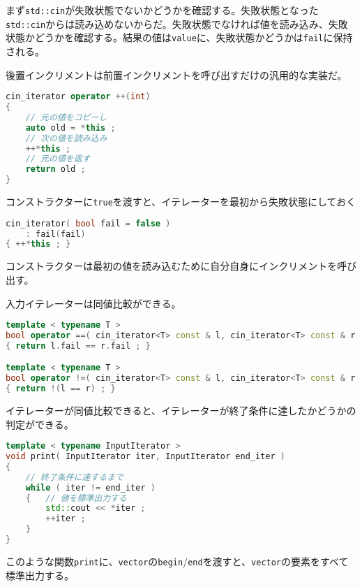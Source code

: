 まず\texttt{std::cin}が失敗状態でないかどうかを確認する。失敗状態となった\texttt{std::cin}からは読み込めないからだ。失敗状態でなければ値を読み込み、失敗状態かどうかを確認する。結果の値は\texttt{value}に、失敗状態かどうかは\texttt{fail}に保持される。

後置インクリメントは前置インクリメントを呼び出すだけの汎用的な実装だ。

\begin{lstlisting}[language={C++}]
cin_iterator operator ++(int)
{
    // 元の値をコピーし
    auto old = *this ;
    // 次の値を読み込み
    ++*this ;
    // 元の値を返す
    return old ;
}
\end{lstlisting}

コンストラクターに\texttt{true}を渡すと、イテレーターを最初から失敗状態にしておく

\begin{lstlisting}[language={C++}]
cin_iterator( bool fail = false )
    : fail(fail)
{ ++*this ; }    
\end{lstlisting}

コンストラクターは最初の値を読み込むために自分自身にインクリメントを呼び出す。

\ifTombow\pagebreak\fi
入力イテレーターは同値比較ができる。

\begin{lstlisting}[language={C++}]
template < typename T >
bool operator ==( cin_iterator<T> const & l, cin_iterator<T> const & r )
{ return l.fail == r.fail ; }

template < typename T >
bool operator !=( cin_iterator<T> const & l, cin_iterator<T> const & r )
{ return !(l == r) ; }
\end{lstlisting}

イテレーターが同値比較できると、イテレーターが終了条件に達したかどうかの判定ができる。

\begin{lstlisting}[language={C++}]
template < typename InputIterator >
void print( InputIterator iter, InputIterator end_iter )
{
    // 終了条件に達するまで
    while ( iter != end_iter )
    {   // 値を標準出力する
        std::cout << *iter ;
        ++iter ;
    }
}
\end{lstlisting}

このような関数\texttt{print}に、\texttt{vector}の\texttt{begin}/\texttt{end}を渡すと、\texttt{vector}の要素をすべて標準出力する。

